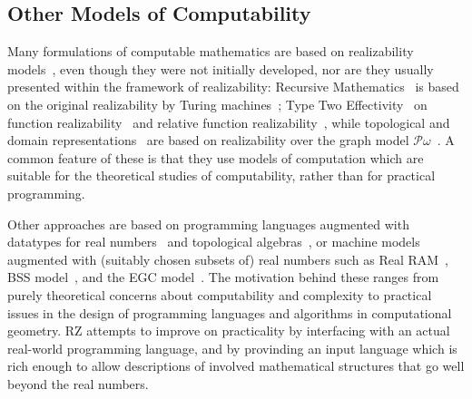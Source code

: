 \subsection{Other Models of Computability}
\label{sec:models-of-computability}

Many formulations of computable mathematics are based on realizability
models~\cite{Bauer:00}, even though they were not initially developed,
nor are they usually presented within the framework of realizability:
Recursive Mathematics~\cite{ershov98:_handb_recur_mathem} is based on
the original realizability by Turing machines~\cite{KleeneSC:intint};
Type Two Effectivity~\cite{Wei00} on function
realizability~\cite{KleeneSC:fouim} and relative function
realizability~\cite{BirkedalL:devttc}, while topological and domain
representations~\cite{Bla97a,Bauer:Birkedal:Scott:98} are based on
realizability over the graph model
$\mathcal{P}\omega$~\cite{ScottD:dattl}. A common feature of these is
that they use models of computation which are suitable for the
theoretical studies of computability, rather than for practical
programming. 

Other approaches are based on programming languages augmented with
datatypes for real
numbers~\cite{Escardo,that-mexican-student-of-escardo} and topological
algebras~\cite{TZ98}, or machine models augmented with (suitably chosen
subsets of) real numbers such as Real
RAM~\cite{aho74:_desig_analy_comput_algor}, BSS
model~\cite{blum98:_compl_real_comput}, and the EGC
model~\cite{yap06:_theor_real_comput_egc}. The motivation behind these
ranges from purely theoretical concerns about computability and
complexity to practical issues in the design of programming languages
and algorithms in computational geometry. RZ attempts to improve on
practicality by interfacing with an actual real-world programming
language, and by provinding an input language which is rich enough to
allow descriptions of involved mathematical structures that go well
beyond the real numbers.



